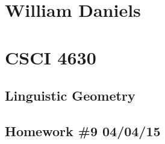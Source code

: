 \documentclass[11pt]{article}
\begin{document}
\begin{center}
\section*{William Daniels}
\section*{CSCI 4630}
\subsection*{Linguistic Geometry}
\subsection*{Homework \#9 04/04/15}
\end{center}

\vspace{.25cm}
\end{document}

